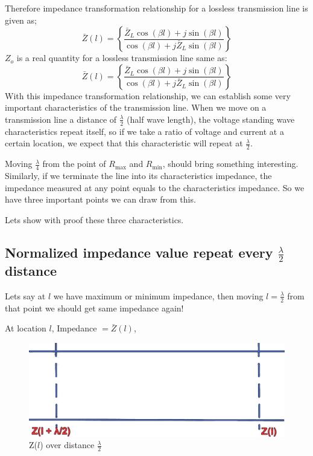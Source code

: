 Therefore impedance transformation relationship for a lossless transmission line is given as;
\begin{equation}
\bar{Z}(l) = \left\lbrace \frac{\bar{Z}_L\cos(\beta l) + j\sin(\beta l)}{\cos(\beta l) + j\bar{Z}_L\sin(\beta l)}\right\rbrace
\label{eqn:charimp}
\end{equation}
$Z_o$ is a real quantity for a lossless transmission line same as:
\begin{equation}
\bar{Z}(l) = \left\lbrace \frac{\bar{Z}_L\cos(\beta l) + j\sin(\beta l)}{\cos(\beta l) + j\bar{Z}_L\sin(\beta l)}\right\rbrace
\label{eqn:charimpnorm}
\end{equation}
With this impedance transformation relationship, we can establish some very important characteristics of the transmission line. When we move on a transmission line a distance of $\frac{\lambda}{2}$ (half wave length), the voltage standing wave characteristics repeat itself, so if we take a ratio of voltage and current at a certain location, we expect that this characteristic will repeat at $\frac{\lambda}{2}$.

Moving $\frac{\lambda}{4}$ from the point of $R_{\max}$ and $R_{\min}$, should bring something interesting. Similarly, if we terminate the line into its characteristics impedance, the impedance measured at any point equals to the characteristics impedance. So we have three important points we can draw from this.

Lets show with proof these three characteristics.
\subsection{Normalized impedance value repeat every $\frac{\lambda}{2}$ distance}
Lets say at $l$ we have maximum or minimum impedance, then moving $l=\frac{\lambda}{2}$ from that point we should get same impedance again!

At location $l$, Impedance $= \bar{Z}(l)$,
\begin{figure}[h]
\centering
\includegraphics[width=0.8\linewidth]{./graphics/6}
\caption{Z($l$) over distance $\frac{\lambda}{2}$}
\label{fig:astyuif}
\end{figure}

